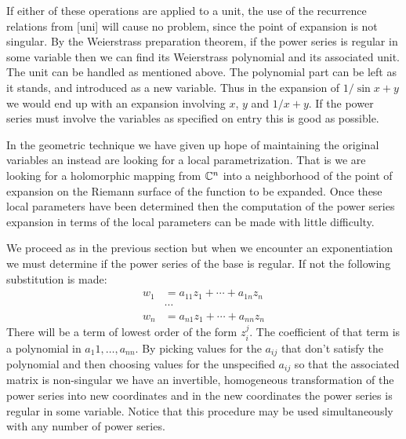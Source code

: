 If either of these operations are applied to a unit, the use of the
recurrence relations from [{uni}] will cause no problem, since the
point of expansion is not singular.  By the Weierstrass preparation
theorem, if the power series is regular in some variable then we can
find its Weierstrass polynomial and its associated unit.  The unit can
be handled as mentioned above.  The polynomial part can be left as it
stands, and introduced as a new variable.  Thus in the expansion of $1
/ \sin x+y$ we would end up with an expansion involving $x$, $y$ and
$1 / x+y$.  If the power series must involve the variables as
specified on entry this is good as possible.

In the geometric technique we have given up hope of maintaining the
original variables an instead are looking for a local parametrization.
That is we are looking for a holomorphic mapping from $\mathbb{C}^n$ into a
neighborhood of the point of expansion on the Riemann surface of the
function to be expanded.  Once these local parameters have been
determined then the computation of the power series expansion in terms
of the local parameters can be made with little difficulty.

We proceed as in the previous section but when we encounter
an exponentiation we must determine if the power series of the base is 
regular.  If not the following substitution is made: 
\[
\begin{aligned}
  w_1 &= a_{11} z_1 + \cdots + a_{1n} z_n\\
    &\cdots\\
  w_n &= a_{n1} z_1 + \cdots + a_{nn} z_n
\end{aligned}
\]
There will be a term of lowest order of the form $z_i^j$.  The
coefficient of that term is a polynomial in $a_1{1}, \ldots , a_{nn}$.
By picking values for the $a_{ij}$ that don't satisfy the polynomial
and then choosing values for the unspecified $a_{ij}$ so that the
associated matrix is non-singular we have an invertible, homogeneous
transformation of the power series into new coordinates and in the new
coordinates the power series is regular in some variable.  Notice that
this procedure may be used simultaneously with any number of power
series.

